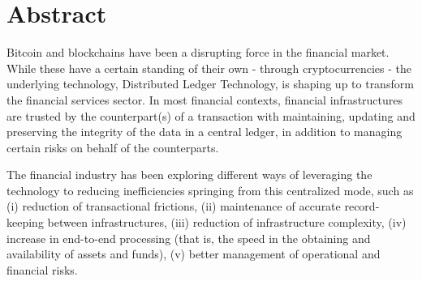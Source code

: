 
\newpage

\mbox{}\vfill
\chapter*{\centering Abstract}

Bitcoin and blockchains have been a disrupting force in the financial market. While these have a certain standing of their own - through cryptocurrencies - the underlying technology, Distributed Ledger Technology, is shaping up to transform the financial services sector. 
In most financial contexts, financial infrastructures are trusted by the counterpart(s) of a transaction with maintaining, updating and preserving the integrity of the data in a central ledger, in addition to managing certain risks on behalf of the counterparts.

The financial industry has been exploring different ways of leveraging the technology to reducing inefficiencies springing from this centralized mode, such as (i) reduction of transactional frictions, (ii) maintenance of accurate record-keeping between infrastructures,  (iii) reduction of infrastructure complexity, (iv) increase in end-to-end processing (that is, the speed in the obtaining and availability of assets and funds), (v) better management of operational and financial risks. 


\iffalse 

DLT could reduce the traditional reliance on a central ledger managed by a trusted
entity for holding and transferring funds and other financial assets.
transparency and immutability in transaction record-keeping?
improving resilience through distributed data management?
\fi
\mbox{}\vfill
